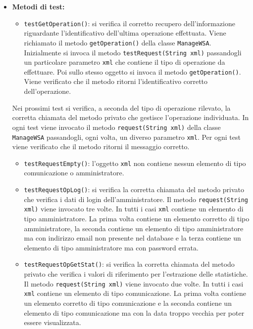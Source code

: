 {\begin{sloppypar}
{\begin{itemize}
\begin{itemize}
					\item[] \textbf{Metodi di test:}
					\begin{itemize}
						\item \texttt{testGetOperation()}: si verifica il corretto recupero dell'informazione riguardante l'identificativo dell'ultima operazione effettuata. Viene richiamato il metodo \texttt{getOperation()} della classe \texttt{ManageWSA}. Inizialmente si invoca il metodo \texttt{testRequest(String xml)} passandogli un particolare parametro \texttt{xml} che contiene il tipo di operazione da effettuare. Poi sullo stesso oggetto si invoca il metodo \texttt{getOperation()}. Viene verificato che il metodo ritorni l'identificativo corretto dell'operazione.
						\end{itemize}
						
Nei prossimi test si verifica, a seconda del tipo di operazione rilevato, la corretta chiamata del metodo privato che gestisce l'operazione individuata. In ogni test viene invocato il metodo \texttt{request(String xml)} della classe \texttt{ManageWSA} passandogli, ogni volta, un diverso parametro \texttt{xml}. Per ogni test viene verificato che il metodo ritorni il messaggio corretto.
					\begin{itemize}
						\item \texttt{testRequestEmpty()}: l'oggetto \texttt{xml} non contiene nessun elemento di tipo comunicazione o amministratore.
						
						\item \texttt{testRequestOpLog()}: si verifica la corretta chiamata del metodo privato che verifica i dati di login dell'amministratore. Il metodo \texttt{request(String xml)} viene invocato tre volte. In tutti i casi \texttt{xml} contiene un elemento di tipo amministratore. La prima volta contiene un elemento corretto di tipo amministratore, la seconda contiene un elemento di tipo amministratore ma con indirizzo email non presente nel database e la terza contiene un elemento di tipo amministratore ma con password errata.
						
						\item \texttt{testRequestOpGetStat()}: si verifica la corretta chiamata del metodo privato che verifica i valori di riferimento per l'estrazione delle statistiche. Il metodo \texttt{request(String xml)} viene invocato due volte. In tutti i casi \texttt{xml} contiene un elemento di tipo comunicazione. La prima volta contiene un elemento corretto di tipo comunicazione e la seconda contiene un elemento di tipo comunicazione ma con la data troppo vecchia per poter essere visualizzata.
						

\end{itemize}
\end{itemize}
\end{itemize}}
\end{sloppypar}}
